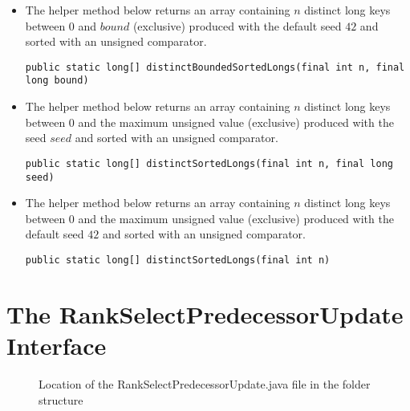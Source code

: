 \begin{itemize}
    \item
    The helper method below returns an array containing $n$ distinct {\ttfamily long} keys between $0$ and $bound$ (exclusive) produced with the default seed $42$ and sorted with an unsigned comparator.
    \begin{lstlisting}
public static long[] distinctBoundedSortedLongs(final int n, final long bound)
    \end{lstlisting}
    
    \item
    The helper method below returns an array containing $n$ distinct {\ttfamily long} keys between $0$ and the maximum unsigned value (exclusive) produced with the seed $seed$ and sorted with an unsigned comparator.
    \begin{lstlisting}
public static long[] distinctSortedLongs(final int n, final long seed)
    \end{lstlisting}
    
    \item
    The helper method below returns an array containing $n$ distinct {\ttfamily long} keys between $0$ and the maximum unsigned value (exclusive) produced with the default seed $42$ and sorted with an unsigned comparator.
    \begin{lstlisting}
public static long[] distinctSortedLongs(final int n)
    \end{lstlisting}
\end{itemize}

\newpage
\section{The {\ttfamily RankSelectPredecessorUpdate} Interface}

\begin{figure}[H]
\caption{Location of the {\ttfamily RankSelectPredecessorUpdate.java} file in the folder structure}
\label{fig:RankSelectPredecessorUpdateTree}
\end{figure}

